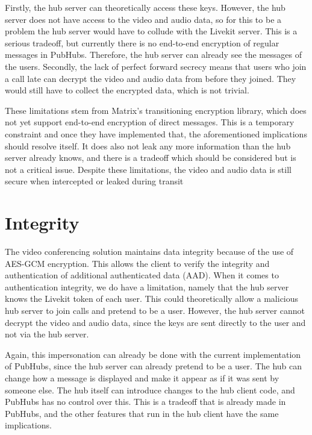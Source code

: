 \documentclass{report}
\begin{document}
Firstly, the hub server can theoretically access these
keys. However, the hub server does not have access to the video and audio data, so for this to be a problem the hub
server would have to collude with the Livekit server. This is a serious tradeoff, but currently there is no end-to-end
encryption of regular messages in PubHubs. Therefore, the hub server can already see the messages of the users. Secondly,
the lack of perfect forward secrecy means that users who join a call late can decrypt the video and audio data from
before they joined. They would still have to collect the encrypted data, which is not trivial.

These limitations stem from Matrix's transitioning encryption library, which does not yet support end-to-end
encryption of direct messages. This is a temporary constraint and once they have implemented that, the
aforementioned implications should resolve itself. It does also not leak any more information than the hub server
already knows, and there is a tradeoff which should be considered but is not a critical issue. Despite these limitations,
the video and audio data is still secure when intercepted or leaked during transit

\section{Integrity}
The video conferencing solution maintains data integrity because of the use of AES-GCM encryption. This allows the
client to verify the integrity and authentication of additional authenticated data (AAD). When it comes to
authentication integrity, we do have a limitation, namely that the hub server knows the Livekit token of each user.
This could theoretically allow a malicious hub server to join calls and pretend to be a user. However, the hub
server cannot decrypt the video and audio data, since the keys are sent directly to the user and not via the hub server.

Again, this impersonation can already be done with the current implementation of PubHubs, since the hub server can
already pretend to be a user. The hub can change how a message is displayed and make it appear as if it was sent by
someone else. The hub itself can introduce changes to the hub client code, and PubHubs has no control over this.
This is a tradeoff that is already made in PubHubs, and the other features that run in the hub client have the same
implications.
\end{document}
